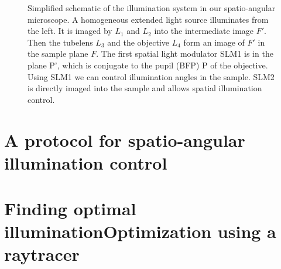 \begin{figure}[!hbt]
  \centering
  \caption{Simplified schematic of the illumination system in our
    spatio-angular microscope. A homogeneous extended light source
    illuminates from the left. It is imaged by $L_1$ and $L_2$ into
    the intermediate image $F'$. Then the tubelens $L_3$ and the
    objective $L_4$ form an image of $F'$ in the sample plane $F$. The
    first spatial light modulator SLM1 is in the plane P', which is
    conjugate to the pupil (BFP) P of the objective. Using SLM1 we can
    control illumination angles in the sample. SLM2 is directly imaged
    into the sample and allows spatial illumination
    control.} 
  \label{fig:memi-simple}
\end{figure}

\section{A protocol for spatio-angular illumination control}
\section{Finding optimal illuminationOptimization using a raytracer}
